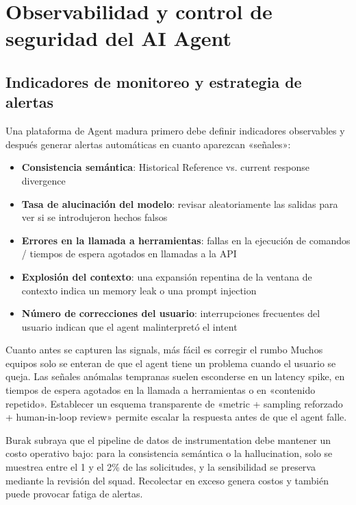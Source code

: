 \section{Observabilidad y control de seguridad del AI Agent}

\subsection{Indicadores de monitoreo y estrategia de alertas}

Una plataforma de Agent madura primero debe definir indicadores observables y después generar alertas automáticas en cuanto aparezcan «señales»:

\begin{itemize}
    \item \textbf{Consistencia semántica}: Historical Reference vs. current response divergence
    \item \textbf{Tasa de alucinación del modelo}: revisar aleatoriamente las salidas para ver si se introdujeron hechos falsos
    \item \textbf{Errores en la llamada a herramientas}: fallas en la ejecución de comandos / tiempos de espera agotados en llamadas a la API
    \item \textbf{Explosión del contexto}: una expansión repentina de la ventana de contexto indica un memory leak o una prompt injection
    \item \textbf{Número de correcciones del usuario}: interrupciones frecuentes del usuario indican que el agent malinterpretó el intent
\end{itemize}

\begin{knowledgebox}{Cuanto antes se capturen las signals, más fácil es corregir el rumbo}
Muchos equipos solo se enteran de que el agent tiene un problema cuando el usuario se queja. Las señales anómalas tempranas suelen esconderse en un latency spike, en tiempos de espera agotados en la llamada a herramientas o en «contenido repetido». Establecer un esquema transparente de «metric + sampling reforzado + human-in-loop review» permite escalar la respuesta antes de que el agent falle.
\end{knowledgebox}

Burak subraya que el pipeline de datos de instrumentation debe mantener un costo operativo bajo: para la consistencia semántica o la hallucination, solo se muestrea entre el 1 y el 2\% de las solicitudes, y la sensibilidad se preserva mediante la revisión del squad. Recolectar en exceso genera costos y también puede provocar fatiga de alertas.

